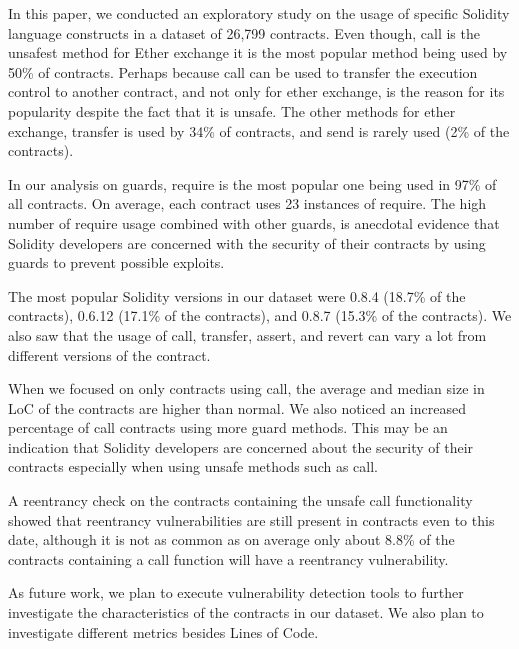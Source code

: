 \documentclass[10pt,conference]{IEEEtran}
\newcommand{\totalContracts}{26,799\xspace}
\begin{document}
In this paper, we conducted an exploratory study on the usage of specific Solidity language constructs in a dataset of \totalContracts contracts. Even though, call is the unsafest method for Ether exchange it is the most popular method being used by 50\% of contracts. Perhaps because call can be used to transfer the execution control to another contract, and not only for ether exchange, is the reason for its popularity despite the fact that it is unsafe. The other methods for ether exchange, transfer is used by 34\% of contracts, and send is rarely used (2\% of the contracts).

In our analysis on guards, require is the most popular one being used in 97\% of all contracts. On average, each contract uses 23 instances of require. The high number of require usage combined with other guards, is anecdotal evidence that Solidity developers are concerned with the security of their contracts by using guards to prevent possible exploits.

The most popular Solidity versions in our dataset were 0.8.4 (18.7\% of the contracts), 0.6.12 (17.1\% of the contracts), and 0.8.7 (15.3\% of the contracts). We also saw that the usage of call, transfer, assert, and revert can vary a lot from different versions of the contract.

When we focused on only contracts using call, the average and median size in LoC of the contracts are higher than normal. We also noticed an increased percentage of call contracts using more guard methods.  This may be an indication that Solidity developers are concerned about the security of their contracts especially when using unsafe methods such as call.

A reentrancy check on the contracts containing the unsafe call functionality showed that reentrancy vulnerabilities are still present in contracts even to this date, although it is not as common as on average only about 8.8\% of the contracts containing a call function will have a reentrancy vulnerability. 

As future work, we plan to execute vulnerability detection tools to further investigate the characteristics of the contracts in our dataset.  We also plan to investigate different metrics besides Lines of Code.






\end{document}
